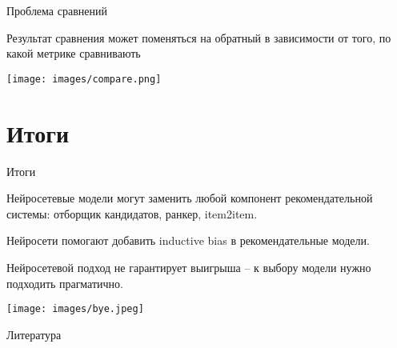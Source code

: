 \documentclass[11pt,aspectratio=169]{beamer}
\begin{document}
\begin{frame}{Проблема сравнений \cite{DALMANN}}

\begin{tcolorbox}[colback=warn!5,colframe=warn!80,title=]
Результат сравнения может поменяться на обратный в зависимости от того, по какой метрике сравнивають
\end{tcolorbox}

\begin{center}
\texttt{[image: images/compare.png]}
\end{center}

\end{frame}

\section{Итоги}

\begin{frame}{Итоги}

\begin{tcolorbox}[colback=info!5,colframe=info!80,title=]
Нейросетевые модели могут заменить любой компонент рекомендательной системы: отборщик кандидатов, ранкер, item2item.
\end{tcolorbox}

\begin{tcolorbox}[colback=info!5,colframe=info!80,title=]
Нейросети помогают добавить inductive bias в рекомендательные модели.
\end{tcolorbox}

\begin{tcolorbox}[colback=warn!5,colframe=warn!80,title=]
Нейросетевой подход не гарантирует выигрыша -- к выбору модели нужно подходить прагматично.
\end{tcolorbox}

\end{frame}

\begin{frame}
\begin{center}
\texttt{[image: images/bye.jpeg]}
\end{center}
\end{frame}

\begin{frame}[allowframebreaks]{Литература}




\end{frame}
\end{document}
